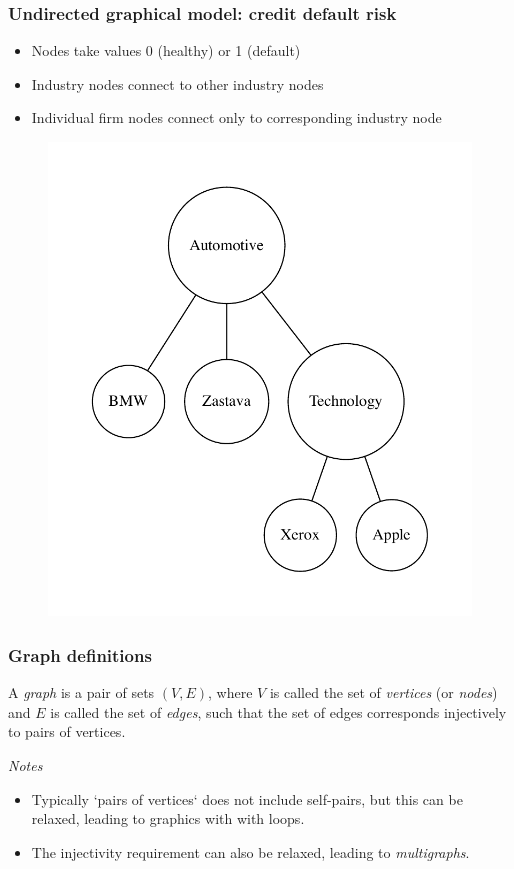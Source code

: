 \begin{frame}
\frametitle{Undirected graphical model: credit default risk \cite{filiz2012graphical}}

\begin{itemize}
  \item Nodes take values 0 (healthy) or 1 (default)
  \item Industry nodes connect to other industry nodes
  \item Individual firm nodes connect only to corresponding industry node
\end{itemize}
\begin{figure}[ht]
  \centering
  \includegraphics[height=0.6\textheight]{graphics/credit_default}
\end{figure}
\end{frame}


\begin{frame}
\frametitle{Graph definitions}
\begin{definition}
A \emph{graph} is a pair of sets $(V, E)$, where $V$ is called the set of \emph{vertices} (or \emph{nodes}) and $E$ is called the set of \emph{edges}, such that the set of edges corresponds injectively to pairs of vertices. \newline
\end{definition}

\emph{Notes}
\begin{itemize}
\item Typically `pairs of vertices` does not include self-pairs, but this can be relaxed, leading to graphics with with loops.
\item The injectivity requirement can also be relaxed, leading to \emph{multigraphs}.
\end{itemize}
\end{frame}


